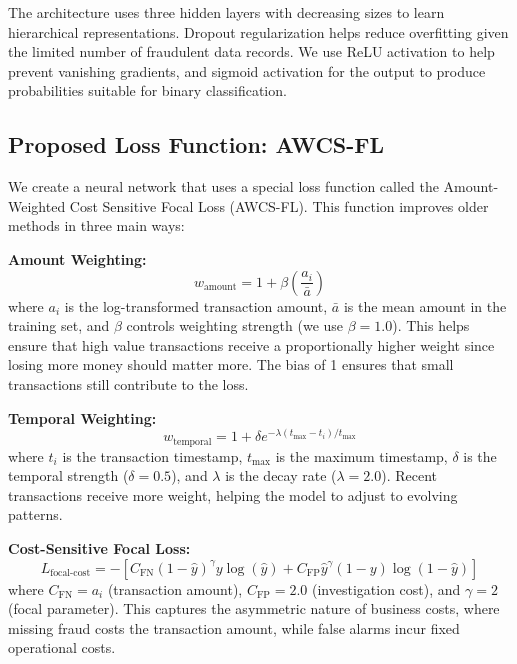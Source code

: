 \documentclass[10pt,twocolumn,letterpaper]{article}
\begin{document}
The architecture uses three hidden layers with decreasing sizes to learn hierarchical representations. Dropout regularization helps reduce overfitting given the limited number of fraudulent data records. We use ReLU activation to help prevent vanishing gradients, and sigmoid activation for the output to produce probabilities suitable for binary classification.

\subsection{Proposed Loss Function: AWCS-FL}

We create a neural network that uses a special loss function called the Amount-Weighted Cost Sensitive Focal Loss (AWCS-FL). This function improves older methods in three main ways:

\textbf{Amount Weighting:} 
\begin{equation}
  w_{\text{amount}} = 1 + \beta\left(\frac{a_i}{\bar{a}}\right)
\end{equation}
where $a_i$ is the log-transformed transaction amount, $\bar{a}$ is the mean amount in the training set, and $\beta$ controls weighting strength (we use $\beta = 1.0$). This helps ensure that high value transactions receive a proportionally higher weight since losing more money should matter more. The bias of 1 ensures that small transactions still contribute to the loss.

\textbf{Temporal Weighting:} 
\begin{equation}
  w_{\text{temporal}} = 1 + \delta e^{-\lambda(t_{\max} - t_i) / t_{\max}}
\end{equation}
where $t_i$ is the transaction timestamp, $t_{\max}$ is the maximum timestamp, $\delta$ is the temporal strength ($\delta = 0.5$), and $\lambda$ is the decay rate ($\lambda = 2.0$). Recent transactions receive more weight, helping the model to adjust to evolving patterns.

\textbf{Cost-Sensitive Focal Loss:} 
\begin{equation}
  L_{\text{focal-cost}} = -\left[ C_{\text{FN}}(1-\hat{y})^{\gamma} y \log(\hat{y}) + C_{\text{FP}}\hat{y}^{\gamma}(1-y)\log(1-\hat{y}) \right]
\end{equation}
where $C_{\text{FN}} = a_i$ (transaction amount), $C_{\text{FP}} = 2.0$ (investigation cost), and $\gamma = 2$ (focal parameter). This captures the asymmetric nature of business costs, where missing fraud costs the transaction amount, while false alarms incur fixed operational costs.
\end{document}
